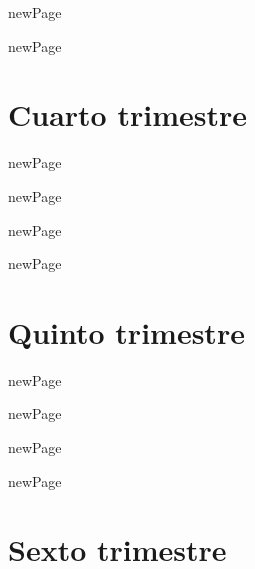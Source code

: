 \documentclass{book}
\begin{document}
\begin{htmlDiv}{newPage}
	
\end{htmlDiv}

\begin{htmlDiv}{newPage}
	
\end{htmlDiv}

\part{Cuarto trimestre}

\begin{htmlDiv}{newPage}
	
\end{htmlDiv}

\begin{htmlDiv}{newPage}
	
\end{htmlDiv}

\begin{htmlDiv}{newPage}
	
\end{htmlDiv}

\begin{htmlDiv}{newPage}
	
\end{htmlDiv}

\part{Quinto trimestre}

\begin{htmlDiv}{newPage}
	
\end{htmlDiv}

\begin{htmlDiv}{newPage}
	
\end{htmlDiv}

\begin{htmlDiv}{newPage}
	
\end{htmlDiv}

\begin{htmlDiv}{newPage}
	
\end{htmlDiv}

\part{Sexto trimestre}
\end{document}

